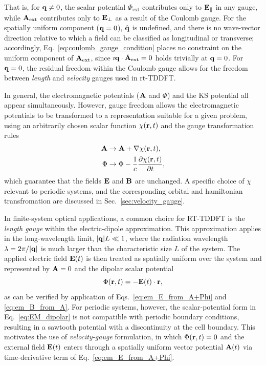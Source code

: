 That is, for $\vb q\neq 0$, the scalar potential  $\Phi_{\mathrm{ext}}$ contributes only  to $\vb E_\parallel$ in any gauge, 
while $\vb A_{\mathrm{ext}}$ contributes  only to $\vb E_\perp$  as a result of the Coulomb gauge.
For the spatially uniform component ($\vb q=0$), $\hat{\vb q}$ is undefined, and
there is no wave-vector direction relative to which a field
can be classified as longitudinal or transverse;
accordingly, Eq.~\eqref{eq:coulomb_gauge_condition} places no constraint on the uniform
component of $\vb A_{\mathrm{ext}}$, since
$\imath\vb q\cdot\tilde{\vb A}_{\mathrm{ext}}=0$ holds trivially at $\vb q=0$.
For $\vb q= 0$, the residual freedom within the Coulomb gauge allows for the  freedom between \emph{length} and \emph{velocity}
gauges used in rt-TDDFT.


In general, the electromagnetic potentials ($\vb A$ and $\Phi$) and
the KS potential all appear simultaneously. However, gauge freedom
allows the electromagnetic potentials to be transformed to a
representation suitable for a given problem, using
an arbitrarily chosen  scalar function $\chi(\vb r,t)$
and the gauge transformation rules
\begin{align}
 \vb A&\to\vb A+\nabla\chi(\vb r,t),
	\label{eq:gauge-rules-A}\\
 \Phi&\to\Phi-\frac{1}{c}
 \frac{\partial\chi(\vb r,t)}{\partial t},
	\label{eq:gauge-rules}
\end{align}
which  guarantee that the fields $\vb E$ and $\vb B$ are unchanged.
A specific choice of $\chi$ relevant to periodic systems, and the corresponding orbital and hamiltonian transfromation  are  discussed
in Sec.~\ref{sec:velocity_gauge}.

In finite-system optical applications, a common choice for
RT-TDDFT is the \emph{length gauge} within the electric-dipole
approximation. This approximation applies in the long-wavelength
limit, $|\vb q|L\ll1$, where the radiation wavelength
$\lambda=2\pi/|\vb q|$ is much larger than the characteristic
size $L$ of the system. The applied electric field $\vb E(t)$
is then treated as spatially uniform over the system and represented  by $\vb A=0$ 
 and the dipolar scalar potential
\begin{equation}
  \Phi(\vb r,t)=-\vb E(t)\cdot\vb r,
  \label{eq:EM_dipolar}
\end{equation}
as can be  verified by  application of Eqs.~\eqref{eq:em_E_from_A+Phi}  and   \eqref{eq:em_B_from_A}. %
For periodic systems, however, the scalar-potential form in  Eq.~\eqref{eq:EM_dipolar}
 is not compatible with periodic boundary conditions, resulting in 
 a sawtooth potential with a discontinuity at the cell boundary.\cite{Luber-2023-position-operator}
 This motivates  the use of  \emph{velocity-gauge} formulation, in which
 $ \Phi(\vb r,t)=0$  and the  external field $\vb E(t)$ enters through a spatially uniform  vector potential
$\vb A(t)$ via  time-derivative term of Eq.~\eqref{eq:em_E_from_A+Phi}.


